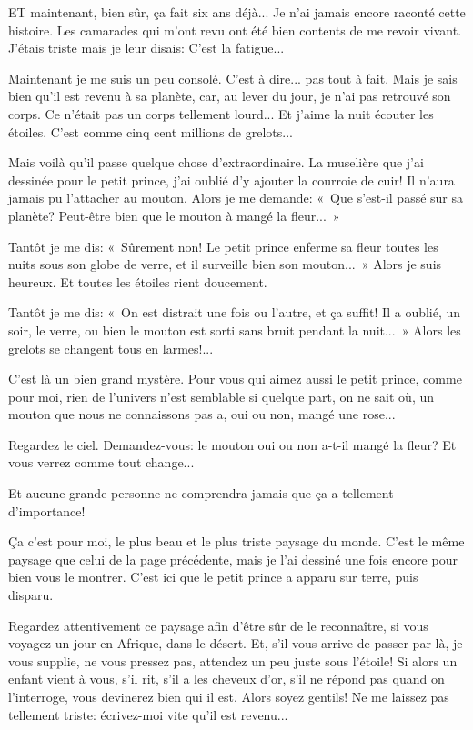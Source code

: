 \documentclass[a4paper]{report}
\begin{document}

\parachapter{} %

ET maintenant, bien sûr, ça fait six ans déjà... Je n'ai jamais encore raconté cette histoire. Les camarades qui m'ont revu ont été bien contents de me revoir vivant. J'étais triste mais je leur disais: C'est la fatigue...

Maintenant je me suis un peu consolé. C'est à dire... pas tout à fait. Mais je sais bien qu'il est revenu à sa planète, car, au lever du jour, je n'ai pas retrouvé son corps. Ce n'était pas un corps tellement lourd... Et j'aime la nuit écouter les étoiles. C'est comme cinq cent millions de grelots...

Mais voilà qu'il passe quelque chose d'extraordinaire. La muselière que j'ai dessinée pour le petit prince, j'ai oublié d'y ajouter la courroie de cuir! Il n'aura jamais pu l'attacher au mouton. Alors je me demande: «~Que s'est-il passé sur sa planète? Peut-être bien que le mouton à mangé la fleur...~»

Tantôt je me dis: «~Sûrement non! Le petit prince enferme sa fleur toutes les nuits sous son globe de verre, et il surveille bien son mouton...~» Alors je suis heureux. Et toutes les étoiles rient doucement.

Tantôt je me dis: «~On est distrait une fois ou l'autre, et ça suffit! Il a oublié, un soir, le verre, ou bien le mouton est sorti sans bruit pendant la nuit...~» Alors les grelots se changent tous en larmes!...

C'est là un bien grand mystère. Pour vous qui aimez aussi le petit prince, comme pour moi, rien de l'univers n'est semblable si quelque part, on ne sait où, un mouton que nous ne connaissons pas a, oui ou non, mangé une rose...

Regardez le ciel. Demandez-vous: le mouton oui ou non a-t-il mangé la fleur? Et vous verrez comme tout change...

Et aucune grande personne ne comprendra jamais que ça a tellement d'importance!


Ça c'est pour moi, le plus beau et le plus triste paysage du monde. C'est le même paysage que celui de la page précédente, mais je l'ai dessiné une fois encore pour bien vous le montrer. C'est ici que le petit prince a apparu sur terre, puis disparu.

Regardez attentivement ce paysage afin d'être sûr de le reconnaître, si vous voyagez un jour en Afrique, dans le désert. Et, s'il vous arrive de passer par là, je vous supplie, ne vous pressez pas, attendez un peu juste sous l'étoile! Si alors un enfant vient à vous, s'il rit, s'il a les cheveux d'or, s'il ne répond pas quand on l'interroge, vous devinerez bien qui il est. Alors soyez gentils! Ne me laissez pas tellement triste: écrivez-moi vite qu'il est revenu...
\end{document}
